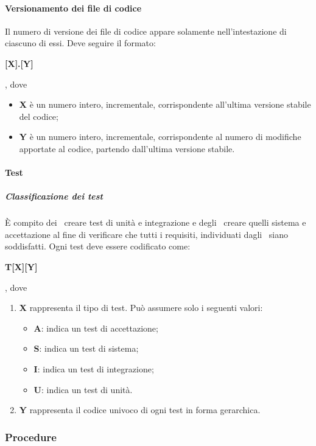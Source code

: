 \documentclass[../NormeProgetto.tex]{subfiles}
\begin{document}
				\paragraph{Versionamento dei file di codice}
					Il numero di versione dei file di codice appare solamente nell'intestazione di ciascuno di essi. Deve seguire il formato:
					\begin{center}\textbf{[X].[Y]}\end{center}, dove
					\begin{itemize}
						\item \textbf{X} è un numero intero, incrementale, corrispondente all'ultima versione stabile del codice;
						\item \textbf{Y} è un numero intero, incrementale, corrispondente al numero di modifiche apportate al codice, partendo dall'ultima versione stabile.
					\end{itemize}
					
				\paragraph{Test}
					\subparagraph{Classificazione dei test}
					È compito dei \programmatori\ creare test di unità e integrazione e degli \analisti\ creare quelli sistema e accettazione al fine di verificare che tutti i requisiti, individuati dagli \analisti\, siano soddisfatti. Ogni test deve essere codificato come:
					\begin{center}\textbf{T[X][Y]}\end{center}, dove
						\begin{enumerate}
							\item \textbf{X} rappresenta il tipo di test. Può assumere solo i seguenti valori:
							\begin{itemize}
								\item \textbf{A}: indica un test di accettazione;
								\item \textbf{S}: indica un test di sistema;
								\item \textbf{I}: indica un test di integrazione;
								\item \textbf{U}: indica un test di unità.
							\end{itemize}
							
							\item \textbf{Y} rappresenta il codice univoco di ogni test in forma gerarchica.
						\end{enumerate}
					
		\subsubsection{Procedure}
\end{document}
